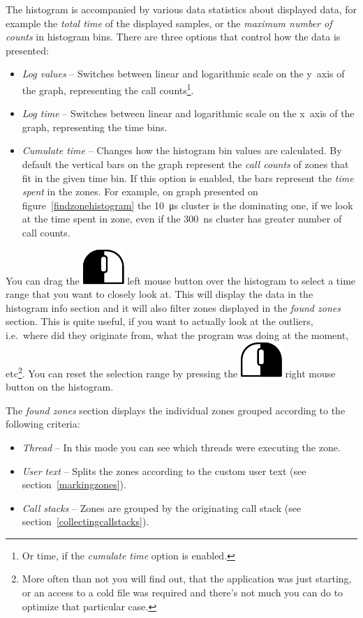 \documentclass[hidelinks,titlepage,a4paper]{article}
\newcommand{\LMB}{\includegraphics[height=.8\baselineskip]{icons/lmb}}
\newcommand{\RMB}{\includegraphics[height=.8\baselineskip]{icons/rmb}}
\begin{document}
The histogram is accompanied by various data statistics about displayed data, for example the \emph{total time} of the displayed samples, or the \emph{maximum number of counts} in histogram bins. There are three options that control how the data is presented:

\begin{itemize}
\item \emph{Log values} -- Switches between linear and logarithmic scale on the y~axis of the graph, representing the call counts\footnote{Or time, if the \emph{cumulate time} option is enabled.}.
\item \emph{Log time} -- Switches between linear and logarithmic scale on the x~axis of the graph, representing the time bins.
\item \emph{Cumulate time} -- Changes how the histogram bin values are calculated. By default the vertical bars on the graph represent the \emph{call counts} of zones that fit in the given time bin. If this option is enabled, the bars represent the \emph{time spent} in the zones. For example, on graph presented on figure~\ref{findzonehistogram} the 10~\si{\micro\second} cluster is the dominating one, if we look at the time spent in zone, even if the 300~\si{\nano\second} cluster has greater number of call counts.
\end{itemize}

You can drag the \LMB{} left mouse button over the histogram to select a time range that you want to closely look at. This will display the data in the histogram info section and it will also filter zones displayed in the \emph{found zones} section. This is quite useful, if you want to actually look at the outliers, i.e.\ where did they originate from, what the program was doing at the moment, etc\footnote{More often than not you will find out, that the application was just starting, or an access to a cold file was required and there's not much you can do to optimize that particular case.}. You can reset the selection range by pressing the \RMB{} right mouse button on the histogram.

The \emph{found zones} section displays the individual zones grouped according to the following criteria:

\begin{itemize}
\item \emph{Thread} -- In this mode you can see which threads were executing the zone.
\item \emph{User text} -- Splits the zones according to the custom user text (see section~\ref{markingzones}).
\item \emph{Call stacks} -- Zones are grouped by the originating call stack (see section~\ref{collectingcallstacks}).
\end{itemize}
\end{document}

